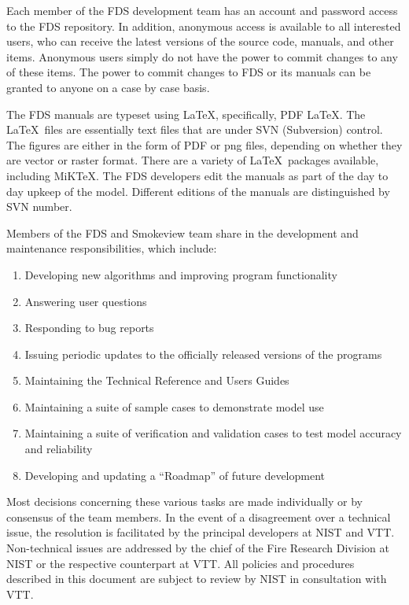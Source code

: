 \documentclass[11pt]{book}
\begin{document}
Each member of the FDS development team has an account and password access to the FDS repository. In addition, anonymous access is available to all
interested users, who can receive the latest versions of the source code, manuals, and other items. Anonymous users simply do not have the power to
commit changes to any of these items. The power to commit changes to FDS or its manuals can be granted to anyone on a case by case basis.

The FDS manuals are typeset using \LaTeX, specifically, PDF \LaTeX. The \LaTeX\ files are essentially text files that are under SVN (Subversion)
control. The figures are either in the form of PDF or png files, depending on whether they are vector or raster format. There are a variety of
\LaTeX\ packages available, including MiKTeX. The FDS developers edit the manuals as part of the day to day upkeep of the model. Different editions of
the manuals are distinguished by SVN number.



Members of the FDS and Smokeview team share in the development and maintenance responsibilities, which include:
\begin{enumerate}
\item Developing new algorithms and improving program functionality
\item Answering user questions
\item Responding to bug reports
\item Issuing periodic updates to the officially released versions of the programs
\item Maintaining the Technical Reference and Users Guides
\item Maintaining a suite of sample cases to demonstrate model use
\item Maintaining a suite of verification and validation cases to test model accuracy and reliability
\item Developing and updating a ``Roadmap'' of future development
\end{enumerate}
Most decisions concerning these various tasks are made individually or by consensus of the team members. In the event of a disagreement over a technical issue, the resolution is facilitated by the principal developers at NIST and VTT. Non-technical issues are addressed by the chief of the Fire Research Division at NIST or the respective counterpart at VTT. All policies and procedures described in this document are subject to review by NIST in consultation with VTT.
\end{document}
